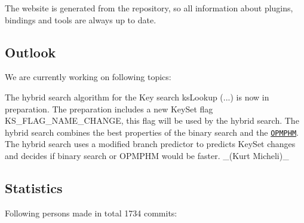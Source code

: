 The website is generated from the repository, so all information about plugins, bindings and tools are always up to date.

\subsection*{Outlook}

We are currently working on following topics\+:


\begin{DoxyItemize}
\item The hybrid search algorithm for the Key search {\ttfamily ks\+Lookup (...)} is now in preparation. The preparation includes a new Key\+Set flag {\ttfamily K\+S\+\_\+\+F\+L\+A\+G\+\_\+\+N\+A\+M\+E\+\_\+\+C\+H\+A\+N\+GE}, this flag will be used by the hybrid search. The hybrid search combines the best properties of the binary search and the \href{https://master.libelektra.org/doc/dev/data-structures.md#order-preserving-minimal-perfect-hash-map-aka-opmphm}{\tt O\+P\+M\+P\+HM}. The hybrid search uses a modified branch predictor to predicts Key\+Set changes and decides if binary search or O\+P\+M\+P\+HM would be faster. \+\_\+(\+Kurt Micheli)\+\_\+
\end{DoxyItemize}

\subsection*{Statistics}

Following persons made in total 1734 commits\+:

